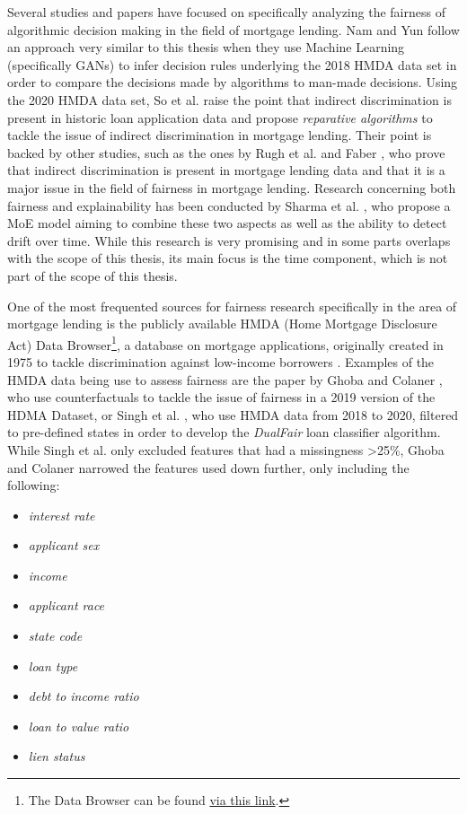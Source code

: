 Several studies and papers have focused on specifically analyzing the fairness of algorithmic decision making in the field of mortgage lending.
Nam and Yun \parencite{Nam2022} follow an approach very similar to this thesis when they use Machine Learning (specifically GANs) to infer decision rules underlying the 2018 HMDA data set in order to compare the decisions made by algorithms to man-made decisions.
Using the 2020 HMDA data set, So et al. \parencite{So2022} raise the point that indirect discrimination is present in historic loan application data and propose \textit{reparative algorithms} to tackle the issue of indirect discrimination in mortgage lending.
Their point is backed by other studies, such as the ones by Rugh et al. \parencite{Rugh2015} and Faber \parencite{Faber2013}, who prove that indirect discrimination is present in mortgage lending data and that it is a major issue in the field of fairness in mortgage lending.
Research concerning both fairness and explainability has been conducted by Sharma et al. \parencite{Sharma2022}, who propose a MoE model aiming to combine these two aspects as well as the ability to detect drift over time.
While this research is very promising and in some parts overlaps with the scope of this thesis, its main focus is the time component, which is not part of the scope of this thesis.

One of the most frequented sources for fairness research specifically in the area of mortgage lending is the publicly available HMDA (Home Mortgage Disclosure Act) Data Browser\footnote{The Data Browser can be found \href{https://ffiec.cfpb.gov/data-browser/data/2022?category=states}{via this link}.}, a database on mortgage applications, originally created in 1975 to tackle discrimination against low-income borrowers \parencite{Bogen2020}.
Examples of the HMDA data being use to assess fairness are the paper by Ghoba and Colaner \parencite{Ghoba}, who use counterfactuals to tackle the issue of fairness in a 2019 version of the HDMA Dataset, or Singh et al. \parencite{Singh2022}, who use HMDA data from 2018 to 2020, filtered to pre-defined states in order to develop the \textit{DualFair} loan classifier algorithm. 
While Singh et al. only excluded features that had a missingness >25\%, Ghoba and Colaner narrowed the features used down further, only including the following:
\begin{itemize}
    \item \textit{interest rate}
    \item \textit{applicant sex}
    \item \textit{income}
    \item \textit{applicant race}
    \item \textit{state code}
    \item \textit{loan type}
    \item \textit{debt to income ratio}
    \item \textit{loan to value ratio}
    \item \textit{lien status}
\end{itemize}

